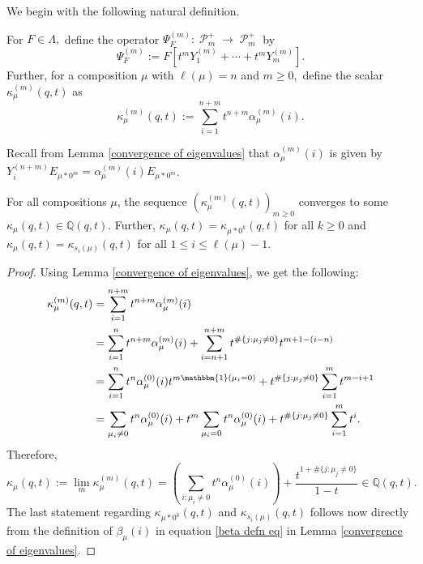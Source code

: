 \documentclass[ALCO,Unicode]{cedram}
\DeclareMathOperator{\sP}{\mathscr{P} }
\begin{document}
We begin with the following natural definition. 

\begin{defi}\label{defn 13}
    For $F \in \Lambda,$ define the operator $\Psi_{F}^{(m)}: \sP_{m}^{+} \rightarrow \sP_{m}^{+}$ by
    \begin{equation}
    \Psi_{F}^{(m)} := F[t^m Y_1^{(m)}+ \cdots + t^m Y_m^{(m)}].
    \end{equation}
    Further, for a composition $\mu$ with $\ell(\mu) = n$ and $m \geq 0,$ define the scalar $\kappa_{\mu}^{(m)}(q,t)$ as 
    \begin{equation}
        \kappa_{\mu}^{(m)}(q,t):= \sum_{i=1}^{n+m} t^{n+m} \alpha_{\mu}^{(m)}(i).
    \end{equation}
    
\end{defi}

 Recall from Lemma \ref{convergence of eigenvalues} that $\alpha_{\mu}^{(m)}(i)$ is given by $Y_{i}^{(n+m)}E_{\mu*0^m} = \alpha_{\mu}^{(m)}(i)E_{\mu*0^m}$.

    
\begin{lemm}\label{kappas converge}
    For all compositions $\mu$, the sequence $(\kappa_{\mu}^{(m)}(q,t))_{m\geq 0}$ converges to some $\kappa_{\mu}(q,t) \in \mathbb{Q}(q,t).$ Further, $\kappa_{\mu}(q,t) = \kappa_{\mu*0^k}(q,t)$ for all $k \geq 0$ and $\kappa_{\mu}(q,t) = \kappa_{s_i(\mu)}(q,t) $ for all $1\leq i \leq \ell(\mu) -1$.
\end{lemm}

\begin{proof}
    Using Lemma \ref{convergence of eigenvalues}, we get the following:
\begin{align*}
    \kappa_{\mu}^{(m)}(q,t) &= \sum_{i=1}^{n+m}t^{n+m}\alpha_{\mu}^{(m)}(i) \\
    &= \sum_{i=1}^{n}t^{n+m}\alpha_{\mu}^{(m)}(i) + \sum_{i=n+1}^{n+m} t^{\#\{j:\mu_j \neq 0\}}t^{m+1-(i-n)} \\
    &= \sum_{i=1}^{n}t^n \alpha_{\mu}^{(0)}(i) t^{m \mathbbm{1}(\mu_i=0)} + t^{\#\{j:\mu_j \neq 0\}}\sum_{i=1}^{m}t^{m-i+1} \\
    &= \sum_{\mu_i \neq 0}t^n \alpha_{\mu}^{(0)}(i) + t^m \sum_{\mu_i =0} t^n \alpha_{\mu}^{(0)}(i) + t^{\#\{j:\mu_j \neq 0\}}\sum_{i=1}^{m}t^{i}.
\end{align*}
Therefore, 
\begin{equation}\label{kappa defn eq}
\kappa_{\mu}(q,t) := \lim_{m} \kappa_{\mu}^{(m)}(q,t) = \left( \sum_{i:\mu_i \neq 0}t^n \alpha_{\mu}^{(0)}(i) \right) + \frac{t^{1+\#\{j:\mu_j \neq 0\}}}{1-t} \in \mathbb{Q}(q,t).
\end{equation}
The last statement regarding $\kappa_{\mu*0^k}(q,t)$ and $\kappa_{s_i(\mu)}(q,t)$ follows now directly from the definition of $\beta_{\mu}(i)$ in equation \eqref{beta defn eq} in Lemma \ref{convergence of eigenvalues}.
\end{proof}
\end{document}
